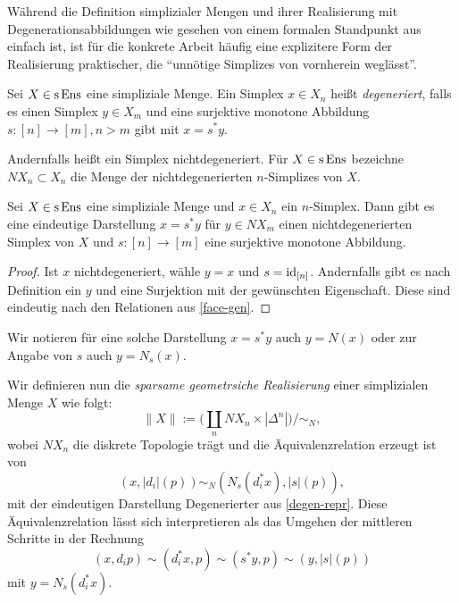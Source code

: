 Während die Definition simplizialer Mengen und ihrer Realisierung mit
Degenerationsabbildungen wie gesehen von einem formalen Standpunkt aus
einfach ist, ist für die konkrete Arbeit häufig eine explizitere Form
der Realisierung praktischer, die ``unnötige Simplizes von vornherein
weglässt''.
\begin{defn}[\cite{GM}, I.2.9]
  Sei $X \in \operatorname{s}\operatorname{Ens}$ eine simpliziale Menge. Ein Simplex $x \in X_n$
  heißt \emph{degeneriert}, falls es einen Simplex $y \in X_m$ und
  eine surjektive monotone Abbildung $s: [n] \to [m], n > m$ gibt mit
  $x = s^* y$.
\end{defn}
Andernfalls heißt ein Simplex nichtdegeneriert. Für $X \in \operatorname{s}\operatorname{Ens}$
bezeichne $NX_n \subset X_n$ die Menge der nichtdegenerierten
$n$-Simplizes von $X$.
\begin{lemma} \label{degen-repr}
  Sei $X \in \operatorname{s}\operatorname{Ens}$ eine simpliziale Menge und $x \in X_n$ ein
  $n$-Simplex. Dann gibt es eine eindeutige Darstellung $x = s^* y$
  für $y \in NX_m$ einen nichtdegenerierten Simplex von $X$ und $s:
  [n] \to [m]$ eine surjektive monotone Abbildung.
\end{lemma}
\begin{proof}
  Ist $x$ nichtdegeneriert, wähle $y = x$ und $s =
  \operatorname{id}_{[n]}$. Andernfalls gibt es nach Definition ein $y$ und eine
  Surjektion mit der gewünschten Eigenschaft. Diese sind eindeutig
  nach den Relationen aus \ref{face-gen}.
\end{proof}
Wir notieren für eine solche Darstellung $x = s^* y$ auch $y = N(x)$
oder zur Angabe von $s$ auch $y = N_s(x)$.

Wir definieren nun die \emph{sparsame geometrsiche Realisierung} einer
simplizialen Menge $X$ wie folgt:
\[ \| X \| := \bigg( \coprod_n NX_n \times |\Delta^n| \bigg) \big/ \sim_N ,\]
wobei $NX_n$ die diskrete Topologie trägt und die Äquivalenzrelation
erzeugt ist von
\[ (x, |d_i|(p)) \sim_N (N_s(d_i^* x), |s|(p)), \]
mit der eindeutigen Darstellung Degenerierter aus
\ref{degen-repr}. Diese Äquivalenzrelation lässt sich interpretieren
als das Umgehen der mittleren Schritte in der Rechnung
\[ (x, d_i p) \sim (d_i^* x, p) \sim (s^* y, p)
   \sim (y, |s|(p)) \]
mit $y = N_s(d_i^* x)$.
   
